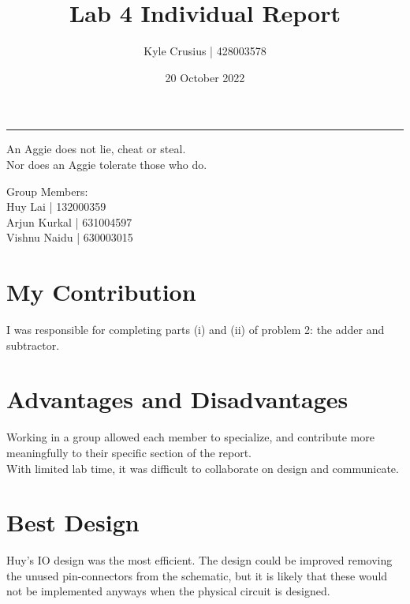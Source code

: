 \documentclass[fleqn,12pt]{article}
\title{\vspace{-2.5cm}Lab 4 Individual Report}
\author{
    Kyle Crusius | 428003578
}
\affil{Texas A\&M University}
\date{\vspace{-28pt}20 October 2022}
\begin{document}
\maketitle
\begin{center}
\vspace{-42pt}
\rule{\textwidth}{.1pt}
{\large
An Aggie does not lie, cheat or steal.\\
Nor does an Aggie tolerate those who do.
}
\end{center}
\begin{center}
Group Members:\\
Huy Lai | 132000359\\
Arjun Kurkal | 631004597\\
Vishnu Naidu | 630003015
\end{center}

\section*{My Contribution}
I was responsible for completing parts (i) and (ii) of problem 2: the adder and subtractor.

\section*{Advantages and Disadvantages}
Working in a group allowed each member to specialize, and contribute more meaningfully to their specific section of the report.\\
With limited lab time, it was difficult to collaborate on design and communicate.

\section*{Best Design}
Huy's IO design was the most efficient. The design could be improved removing the unused pin-connectors from the schematic, but it is likely that these would not be implemented anyways when the physical circuit is designed. 
\end{document}
